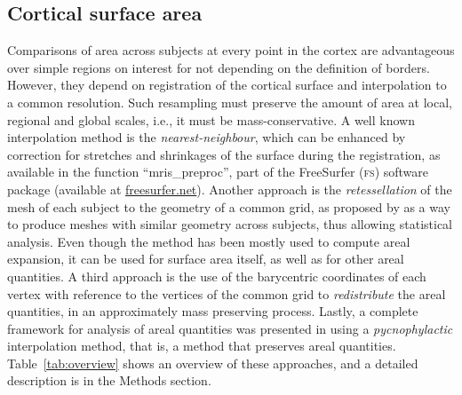 \subsection{Cortical surface area}

Comparisons of area across subjects at every point in the cortex are advantageous over simple regions on interest for not depending on the definition of borders. However, they depend on registration of the cortical surface and interpolation to a common resolution. Such resampling must preserve the amount of area at local, regional and global scales, i.e., it must be mass-conservative. A well known interpolation method is the \emph{nearest-neighbour}, which can be enhanced by correction for stretches and shrinkages of the surface during the registration, as available in the function ``mris\_preproc'', part of the FreeSurfer (\textsc{fs}) software package (available at \href{http://freesurfer.net}{freesurfer.net}). Another approach is the \emph{retessellation} of the mesh of each subject to the geometry of a common grid, as proposed by \cite{Saad2004} as a way to produce meshes with similar geometry across subjects, thus allowing statistical analysis. Even though the method has been mostly used to compute areal expansion, it can be used for surface area itself, as well as for other areal quantities. A third approach is the use of the barycentric coordinates of each vertex with reference to the vertices of the common grid to \emph{redistribute} the areal quantities, in an approximately mass preserving process. Lastly, a complete framework for analysis of areal quantities was presented in \cite{Winkler2012} using a \emph{pycnophylactic} interpolation method, that is, a method that preserves areal quantities. Table~\ref{tab:overview} shows an overview of these approaches, and a detailed description is in the Methods section.

